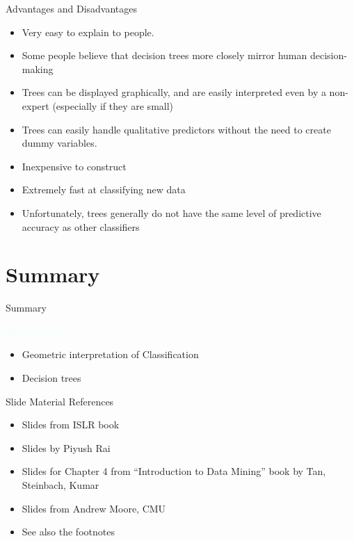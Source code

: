 \documentclass{beamer}
\newcommand{\tblue}[1]{{\Large {\textcolor{azure}{#1}}}}
\begin{document}
\begin{frame}{Advantages and Disadvantages}
    \begin{itemize}
        \item Very easy to explain to people.
        \item Some people believe that decision trees more closely mirror human decision-making
        \item Trees can be displayed graphically, and are easily interpreted even by a non-expert (especially if they are small)
        \item Trees can easily handle qualitative predictors without the need to create dummy variables.
        \item Inexpensive to construct
        \item Extremely fast at classifying new data
        \item Unfortunately, trees generally do not have the same level of predictive accuracy as other classifiers
    \end{itemize}
\end{frame}


\section{Summary}
\begin{frame}{Summary}

\tblue{Major Concepts:}
\begin{itemize}
    \item Geometric interpretation of Classification
    \item Decision trees
\end{itemize}
\end{frame}

\begin{frame}{Slide Material References}
\begin{itemize}
    \item Slides from ISLR book
    \item Slides by Piyush Rai
    \item Slides for Chapter 4 from ``Introduction to Data Mining'' book by Tan, Steinbach, Kumar
    \item Slides from Andrew Moore, CMU
    \item See also the footnotes
\end{itemize}
\end{frame}
\end{document}
